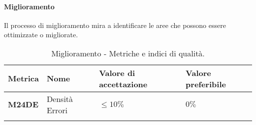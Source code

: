 \paragraph{Miglioramento}
Il processo di miglioramento mira a identificare le aree che possono essere ottimizzate o migliorate.
\hspace{1pt}
    \begin{longtable}{|C{1.5cm}|L{3cm}|L{2.5cm}|L{2.5cm}|}
        \hline
        \textbf{Metrica} & \textbf{Nome} & \textbf{Valore di accettazione} & \textbf{Valore preferibile} \\
        \hline
        \textbf{M24DE} & Densità Errori & $\leq 10\%$ & $ 0\%$ \\
        \hline
    \caption{Miglioramento - Metriche e indici di qualità.}
    \label{tab:metriche_miglioramento}
\end{longtable}